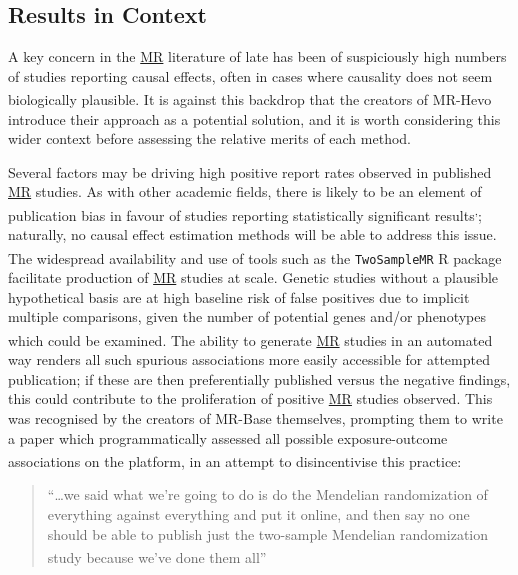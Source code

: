 \documentclass[
]{article}
\begin{document}
\subsection{Results in Context}\label{results-in-context}

A key concern in the \hyperref[acronyms_MR]{MR} literature of late has been of suspiciously high numbers of studies reporting causal effects, often in cases where causality does not seem biologically plausible\textsuperscript{}. It is against this backdrop that the creators of MR-Hevo introduce their approach as a potential solution, and it is worth considering this wider context before assessing the relative merits of each method.

Several factors may be driving high positive report rates observed in published \hyperref[acronyms_MR]{MR} studies. As with other academic fields, there is likely to be an element of publication bias in favour of studies reporting statistically significant results\textsuperscript{,}; naturally, no causal effect estimation methods will be able to address this issue. The widespread availability and use of tools such as the \texttt{TwoSampleMR} R package\textsuperscript{} facilitate production of \hyperref[acronyms_MR]{MR} studies at scale. Genetic studies without a plausible hypothetical basis are at high baseline risk of false positives due to implicit multiple comparisons, given the number of potential genes and/or phenotypes which could be examined\textsuperscript{}. The ability to generate \hyperref[acronyms_MR]{MR} studies in an automated way renders all such spurious associations more easily accessible for attempted publication; if these are then preferentially published versus the negative findings, this could contribute to the proliferation of positive \hyperref[acronyms_MR]{MR} studies observed. This was recognised by the creators of MR-Base themselves, prompting them to write a paper which programmatically assessed all possible exposure-outcome associations on the platform, in an attempt to disincentivise this practice\textsuperscript{}:

\begin{quote}
``\ldots we said what we're going to do is do the Mendelian randomization of everything against everything and put it online, and then say no one should be able to publish just the two-sample Mendelian randomization study because we've done them all''\textsuperscript{}
\end{quote}
\end{document}

